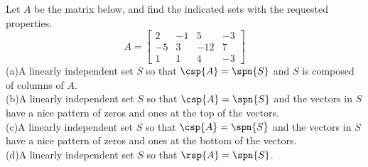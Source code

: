 Let $A$ be the matrix below, and find the indicated sets with the requested properties.
%
\begin{equation*}
A=
\begin{bmatrix}
2 & -1 & 5 & -3\\ 
-5 & 3 & -12 & 7\\ 
1 & 1 & 4 & -3
\end{bmatrix}
\end{equation*}
%
(a)\quad A linearly independent set $S$ so that $\csp{A}=\spn{S}$ and $S$ is composed of columns of $A$.\\
(b)\quad A linearly independent set $S$ so that $\csp{A}=\spn{S}$ and the vectors in $S$ have a nice pattern of zeros and ones at the top of the vectors.\\
(c)\quad A linearly independent set $S$ so that $\csp{A}=\spn{S}$ and the vectors in $S$ have a nice pattern of zeros and ones at the bottom of the vectors.\\
(d)\quad A linearly independent set $S$ so that $\rsp{A}=\spn{S}$.

